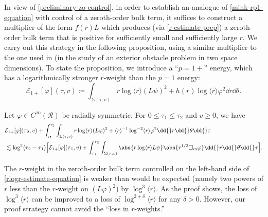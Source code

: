 \documentclass[10pt, reqno]{amsart}
\begin{document}
In view of \cref{preliminary-zo-control}, in order to establish an analogue of
\cref{mink-rp1-equation} with control of a zeroth-order bulk term, it suffices to
construct a multiplier of the form \(f(r)L\) which produces (via
\cref{r-estimate-prep}) a zeroth-order bulk term that is positive for sufficiently
small and sufficiently large \(r\). We carry out this strategy in the following
proposition, using a similar multiplier to the one used in
\cite{metcalfe-hepditch-obstacle} (in the study of an exterior obstacle problem
in two space dimensions). To state the proposition, we introduce a ``\(p=1 +\)''
energy, which has a logarithmically stronger \(r\)-weight than the \(p=1\)
energy:
\begin{equation}\label{E1+def}
\mathcal{E}_{1+}[\varphi{}](\tau{},v)\coloneqq{}\int _{\Sigma{}(\tau{},v)} r\log \langle{}r\rangle{}(L\psi{})^2 + h(r)\log \langle{}r\rangle{}\varphi^2\dd{}r\dd{}\theta{}.
\end{equation}
\begin{proposition}
Let \(\varphi{}\in C^\infty(\mathcal{R})\) be radially symmetric. For \(0\le \tau_1\le \tau_2\) and \(v\ge 0\),
we have
\begin{equation}\label{rlogr-estimate-equation}
\begin{split}
&\mathcal{E}_{1+}[\varphi{}](\tau{}_2,v) + \int_{\tau_1}^{\tau_2} \int _{\Sigma(\tau{},v)} r\log\langle{}r\rangle{}(L\varphi{})^2 + \langle{}r\rangle{}^{-1}\log^{-2}\langle{}r\rangle{}\varphi^2\dd{}r\dd{}\theta{}\dd{}\tau{} \\
&\lesssim \log ^2\langle{}\tau{}_2-\tau{}_1\rangle{}\Bigl[\mathcal{E}_{1+}[\varphi{}](\tau{}_1,v) + \int_{\tau{}_1}^{\tau{}_2}\int _{\Sigma{}(\tau{},v)} \abs{r\log \langle{}r\rangle{}L\psi{}}\abs{r^{1/2}\Box{}_m\varphi{}}
\dd{}r\dd{}\theta{}\dd{}\tau{}\Bigr].
\end{split}
\end{equation}
\label{rlogr-estimate}
\end{proposition}
\begin{remark}
The \(r\)-weight in the zeroth-order bulk term controlled on the left-hand side of
\cref{rlogr-estimate-equation} is weaker than would be expected (namely two powers
of \(r\) less than the \(r\)-weight on \((L\varphi{})^2\)) by \(\log
^3\langle{}r\rangle{}\). As the proof shows, the loss of \(\log
^3\langle{}r\rangle{}\) can be improved to a loss of \(\log ^{2 +
\delta{}}\langle{}r\rangle{}\) for any \(\delta{} > 0\). However, our proof
strategy cannot avoid the ``loss in \(r\)-weights.''
\end{remark}
\end{document}
